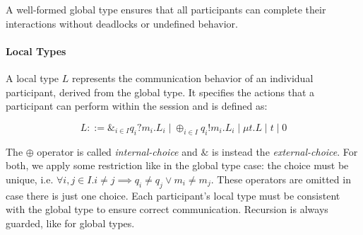 A well-formed global type ensures that all participants can complete their interactions
without deadlocks or undefined behavior.

\paragraph{Local Types}
A local type $L$ represents the communication behavior of an individual participant,
derived from the global type. It specifies the actions that a participant can perform
within the session and is defined as:

\begin{equation}
L ::= \&_{i\in I} q_i?m_i.L_i \mid \oplus_{i\in I} q_i!m_i.L_i \mid \mu t. L \mid t \mid 0
\end{equation}

The $\oplus$ operator is called \textit{internal-choice} and $\&$ is instead the
\textit{external-choice}. For both, we apply some restriction like in the global
type case: the choice must be unique, i.e. $\forall i,j\in I. i \neq j \implies
q_i\neq q_j \lor m_i \neq m_j$. These operators are omitted in case there is just one
choice. Each participant's local type must be consistent with the global type to ensure
correct communication. Recursion is always guarded, like for global types.




